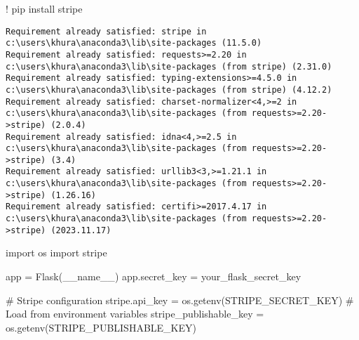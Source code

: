 \documentclass[
  letterpaper,
  DIV=11,
  numbers=noendperiod]{scrreprt}
\author{}
\date{}
\newenvironment{Shaded}{\begin{snugshade}}{\end{snugshade}}
\newcommand{\CommentTok}[1]{\textcolor[rgb]{0.37,0.37,0.37}{#1}}
\newcommand{\ImportTok}[1]{\textcolor[rgb]{0.00,0.46,0.62}{#1}}
\newcommand{\NormalTok}[1]{\textcolor[rgb]{0.00,0.23,0.31}{#1}}
\newcommand{\OperatorTok}[1]{\textcolor[rgb]{0.37,0.37,0.37}{#1}}
\newcommand{\StringTok}[1]{\textcolor[rgb]{0.13,0.47,0.30}{#1}}
\newcommand{\VariableTok}[1]{\textcolor[rgb]{0.07,0.07,0.07}{#1}}
\begin{document}
\begin{Shaded}
\begin{Highlighting}[]
\OperatorTok{!}\NormalTok{ pip install stripe}
\end{Highlighting}
\end{Shaded}

\begin{verbatim}
Requirement already satisfied: stripe in c:\users\khura\anaconda3\lib\site-packages (11.5.0)
Requirement already satisfied: requests>=2.20 in c:\users\khura\anaconda3\lib\site-packages (from stripe) (2.31.0)
Requirement already satisfied: typing-extensions>=4.5.0 in c:\users\khura\anaconda3\lib\site-packages (from stripe) (4.12.2)
Requirement already satisfied: charset-normalizer<4,>=2 in c:\users\khura\anaconda3\lib\site-packages (from requests>=2.20->stripe) (2.0.4)
Requirement already satisfied: idna<4,>=2.5 in c:\users\khura\anaconda3\lib\site-packages (from requests>=2.20->stripe) (3.4)
Requirement already satisfied: urllib3<3,>=1.21.1 in c:\users\khura\anaconda3\lib\site-packages (from requests>=2.20->stripe) (1.26.16)
Requirement already satisfied: certifi>=2017.4.17 in c:\users\khura\anaconda3\lib\site-packages (from requests>=2.20->stripe) (2023.11.17)
\end{verbatim}

\begin{Shaded}
\begin{Highlighting}[]
\ImportTok{import}\NormalTok{ os}
\ImportTok{import}\NormalTok{ stripe}

\NormalTok{app }\OperatorTok{=}\NormalTok{ Flask(}\VariableTok{\_\_name\_\_}\NormalTok{)}
\NormalTok{app.secret\_key }\OperatorTok{=} \StringTok{\textquotesingle{}your\_flask\_secret\_key\textquotesingle{}}

\CommentTok{\# Stripe configuration}
\NormalTok{stripe.api\_key }\OperatorTok{=}\NormalTok{ os.getenv(}\StringTok{\textquotesingle{}STRIPE\_SECRET\_KEY\textquotesingle{}}\NormalTok{)  }\CommentTok{\# Load from environment variables}
\NormalTok{stripe\_publishable\_key }\OperatorTok{=}\NormalTok{ os.getenv(}\StringTok{\textquotesingle{}STRIPE\_PUBLISHABLE\_KEY\textquotesingle{}}\NormalTok{)}
\end{Highlighting}
\end{Shaded}
\end{document}
